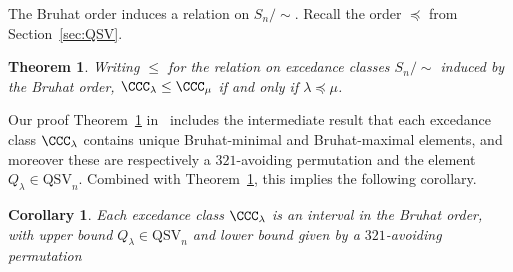 \documentclass[submission]{FPSAC2024}
\newtheorem{thm}[equation]{Theorem}
\newtheorem{cor}[equation]{Corollary}
\theoremstyle{definition}
\theoremstyle{remark}
\newtheorem{rem}[equation]{Remark}
\numberwithin{equation}{section}
\newcommand{\QSV}{\mathrm{QSV}}
\newcommand{\EP}{E_{pos}}
\newcommand{\EV}{E_{val}}
\begin{document}
The Bruhat order induces a relation on $S_{n}\big/\!\!\sim$.
Recall the order $\preceq$ from Section~\ref{sec:QSV}.

\begin{thm}
\label{thm:excedancequotient}
Writing $\le$ for the relation on excedance classes $S_{n}\big/\!\! \sim$ induced by the Bruhat order, $\CCC_{\lambda} \le \CCC_{\mu}$ if and only if $\lambda \preceq \mu$.
\end{thm}

Our proof Theorem~\ref{thm:excedancequotient} in~\cite{BG} includes the intermediate result that each excedance class $\CCC_{\lambda}$ contains unique Bruhat-minimal and Bruhat-maximal elements, and moreover these are respectively a $321$-avoiding permutation and the element $Q_{\lambda} \in \QSV_{n}$.  Combined with Theorem~\ref{thm:excedancequotient}, this implies the following corollary.  

\begin{cor}\label{cor:interval}
Each excedance class $\CCC_{\lambda}$ is an interval in the Bruhat order, with upper bound $Q_{\lambda}\in \QSV_n$ and lower bound given by a $321$-avoiding permutation
\end{cor}



%
\end{document}
